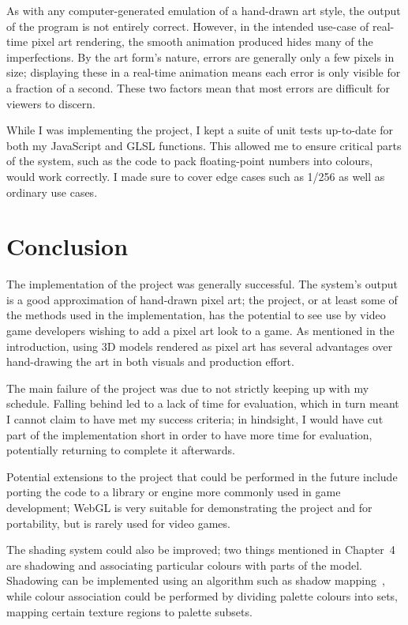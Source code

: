 \documentclass[12pt,twoside,notitlepage]{report}
\begin{document}
As with any computer-generated emulation of a hand-drawn art style, the output of the program is not entirely correct. However, in the intended use-case of real-time pixel art rendering, the smooth animation produced hides many of the imperfections. By the art form's nature, errors are generally only a few pixels in size; displaying these in a real-time animation means each error is only visible for a fraction of a second. These two factors mean that most errors are difficult for viewers to discern.

While I was implementing the project, I kept a suite of unit tests up-to-date for both my JavaScript and GLSL functions. This allowed me to ensure critical parts of the system, such as the code to pack floating-point numbers into colours, would work correctly. I made sure to cover edge cases such as 1/256 as well as ordinary use cases.

\chapter{Conclusion}

The implementation of the project was generally successful. The system's output is a good approximation of hand-drawn pixel art; the project, or at least some of the methods used in the implementation, has the potential to see use by video game developers wishing to add a pixel art look to a game. As mentioned in the introduction, using 3D models rendered as pixel art has several advantages over hand-drawing the art in both visuals and production effort.

The main failure of the project was due to not strictly keeping up with my schedule. Falling behind led to a lack of time for evaluation, which in turn meant I cannot claim to have met my success criteria; in hindsight, I would have cut part of the implementation short in order to have more time for evaluation, potentially returning to complete it afterwards.

Potential extensions to the project that could be performed in the future include porting the code to a library or engine more commonly used in game development; WebGL is very suitable for demonstrating the project and for portability, but is rarely used for video games.

The shading system could also be improved; two things mentioned in Chapter~4 are shadowing and associating particular colours with parts of the model. Shadowing can be implemented using an algorithm such as shadow mapping~\cite{Williams:1978:CCS:965139.807402}, while colour association could be performed by dividing palette colours into sets, mapping certain texture regions to palette subsets.
\end{document}
